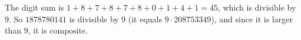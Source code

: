 The digit sum is $1+8+7+8+7+8+0+1+4+1=45$, which is divisible by $9$. So $1878780141$ is divisible by $9$ (it equals $9\cdot208753349$), and since it is larger than $9$, it is $\boxed{\text{composite}}$.
